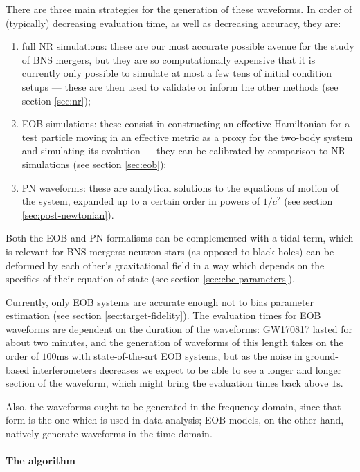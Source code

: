 \documentclass[main.tex]{subfiles}
\begin{document}
There are three main strategies for the generation of these waveforms. In order of (typically) decreasing evaluation time, as well as decreasing accuracy, they are:
\begin{enumerate}
    \item full \ac{NR} simulations: these are our most accurate possible avenue for the study of \ac{BNS} mergers, but they are so computationally expensive that it is currently only possible to simulate at most a few tens of initial condition setups --- these are then used to validate or inform the other methods (see section \ref{sec:nr});
    \item \ac{EOB} simulations: these consist in constructing an effective Hamiltonian for a test particle moving in an effective metric as a proxy for the two-body system and simulating its evolution --- they can be calibrated by comparison to \ac{NR} simulations (see section \ref{sec:eob});
    \item \ac{PN} waveforms: these are analytical solutions to the equations of motion of the system, expanded up to a certain order in powers of $1/c^2$ (see section \ref{sec:post-newtonian}).
\end{enumerate}

Both the \ac{EOB} and \ac{PN} formalisms can be complemented with a tidal term, which is relevant for \ac{BNS} mergers: neutron stars (as opposed to black holes) can be deformed by each other's gravitational field in a way which depends on the specifics of their equation of state (see section \ref{sec:cbc-parameters}). 

Currently, only \ac{EOB} systems are accurate enough not to bias parameter estimation (see section \ref{sec:target-fidelity}).
The evaluation times for \ac{EOB} waveforms are dependent on the duration of the waveforms: GW170817 lasted for about two minutes, and the generation of waveforms of this length takes on the order of $100\text{ms}$ with state-of-the-art \ac{EOB} systems, but as the noise in ground-based interferometers decreases we expect to be able to see a longer and longer section of the waveform, which might bring the evaluation times back above $1\text{s}$. 

Also, the waveforms ought to be generated in the frequency domain, since that form is the one which is used in data analysis;
EOB models, on the other hand, natively generate waveforms in the time domain. 

\paragraph{The algorithm}
\end{document}
